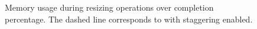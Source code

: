 \begin{figure}[h]
    \caption{Memory usage during resizing operations over completion percentage. The dashed line corresponds to \htone with staggering enabled.}\label{fig:resizing_rss_plot}
\end{figure}